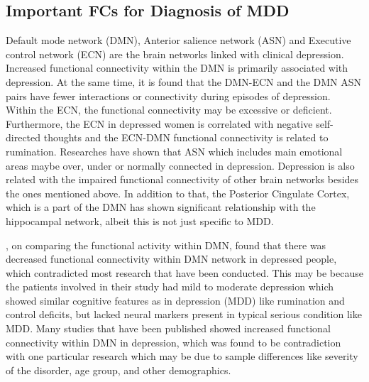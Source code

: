 \documentclass[12pt]{article}
\begin{document}
\subsection{Important FCs for Diagnosis of MDD}

Default mode network (DMN), Anterior salience network (ASN) and
Executive control network (ECN) are the brain networks linked with
clinical depression. Increased functional connectivity within the DMN
is primarily associated with depression. At the same time, it is found
that the DMN-ECN and the DMN ASN pairs have fewer interactions or
connectivity during episodes of depression. Within the ECN, the
functional connectivity may be excessive or deficient. Furthermore,
the ECN in depressed women is correlated with negative self-directed
thoughts and the ECN-DMN functional connectivity is related to
rumination. Researches have shown that ASN which includes main
emotional areas maybe over, under or normally connected in
depression. Depression is also related with the impaired functional
connectivity of other brain networks besides the ones mentioned
above. In addition to that, the Posterior Cingulate Cortex, which is
a part of the DMN has shown significant relationship with the
hippocampal network, albeit this is not just specific to MDD.

\textcite{LRbrainnetwork}, on comparing the functional activity within
DMN, found that there was decreased functional connectivity within DMN
network in depressed people, which contradicted most research that
have been conducted. This may be because the patients involved in
their study had mild to moderate depression which showed similar
cognitive features as in depression (MDD) like rumination and control
deficits, but lacked neural markers present in typical serious
condition like MDD. Many studies that have been published showed
increased functional connectivity within DMN in depression, which was
found to be contradiction with one particular research which may be
due to sample differences like severity of the disorder, age group,
and other demographics.
\end{document}
